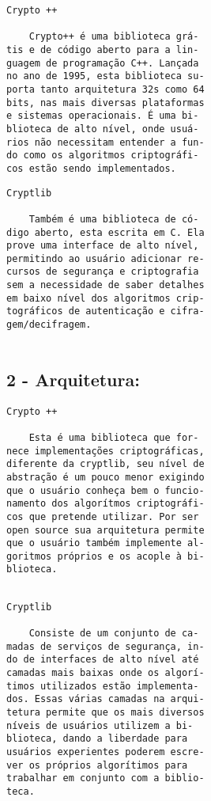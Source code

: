 \documentclass[
    article,            %
    11pt,               %
    oneside,            %
    a4paper,            %
    english,            %
    brazil,             %
    sumario=tradicional,
    ]{abntex2}
\begin{document}
\par\noindent
\begin{minipage}[t]{.49\textwidth}
\begin{Verbatim}[frame=single]
             Crypto ++

    Crypto++ é uma biblioteca grá-
tis e de código aberto para a lin-
guagem de programação C++. Lançada
no ano de 1995, esta biblioteca su-
porta tanto arquitetura 32s como 64
bits, nas mais diversas plataformas
e sistemas operacionais. É uma bi-
blioteca de alto nível, onde usuá-
rios não necessitam entender a fun-
do como os algoritmos criptográfi-
cos estão sendo implementados.
\end{Verbatim}
\end{minipage}
\hfill
\begin{minipage}[t]{.49\textwidth}
\begin{Verbatim}[frame=single]
             Cryptlib

    Também é uma biblioteca de có-
digo aberto, esta escrita em C. Ela
prove uma interface de alto nível,
permitindo ao usuário adicionar re-
cursos de segurança e criptografia
sem a necessidade de saber detalhes
em baixo nível dos algoritmos crip-
tográficos de autenticação e cifra-
gem/decifragem.


\end{Verbatim}
\end{minipage}

\subsection*{\textbf{2 - Arquitetura:}}

\par\noindent
\begin{minipage}[t]{.49\textwidth}
\begin{Verbatim}[frame=single]
             Crypto ++

    Esta é uma biblioteca que for-
nece implementações criptográficas,
diferente da cryptlib, seu nível de
abstração é um pouco menor exigindo
que o usuário conheça bem o funcio-
namento dos algorítmos criptográfi-
cos que pretende utilizar. Por ser
open source sua arquitetura permite
que o usuário também implemente al-
goritmos próprios e os acople à bi-
blioteca.


\end{Verbatim}
\end{minipage}
\hfill
\begin{minipage}[t]{.49\textwidth}
\begin{Verbatim}[frame=single]
             Cryptlib

    Consiste de um conjunto de ca-
madas de serviços de segurança, in-
do de interfaces de alto nível até 
camadas mais baixas onde os algorí-
timos utilizados estão implementa-
dos. Essas várias camadas na arqui-
tetura permite que os mais diversos 
níveis de usuários utilizem a bi-
blioteca, dando a liberdade para 
usuários experientes poderem escre-
ver os próprios algorítimos para 
trabalhar em conjunto com a biblio-
teca.
\end{Verbatim}
\end{minipage}
\end{document}
